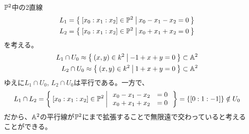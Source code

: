 \documentclass{ltjsreport}
\begin{document}
\begin{eg}
  $\mathbb{P}^2$中の2直線
  \begin{align*}
    L_1=\left\{\:[x_0:x_1:x_2]\in\mathbb{P}^2\:\middle|\:x_0-x_1-x_2=0\:\right\}\\
    L_2=\left\{\:[x_0:x_1:x_2]\in\mathbb{P}^2\:\middle|\:x_0+x_1+x_2=0\:\right\}
  \end{align*}
  を考える。
  \begin{align*}
    L_1\cap U_0\approx\left\{\:(x,y)\in k^2\:\middle|\:-1+x+y=0\:\right\}\subset\mathbb{A}^2\\
    L_2\cap U_0\approx\left\{\:(x,y)\in k^2\:\middle|\:1+x+y=0\:\right\}\subset\mathbb{A}^2
  \end{align*}
  ゆえに$L_1\cap U_0$, $L_2\cap U_0$は平行である。一方で、
  \[
  L_1\cap L_2=\left\{\:[x_0:x_1:x_2]\in\mathbb{P}^2\:\middle|\:
    \begin{array}{cc}
      x_0-x_1-x_2 & =0\\
      x_0+x_1+x_2 & =0
    \end{array}\:\right\}=\{[0:1:-1]\}\notin U_0
  \]
  だから、$\mathbb{A}^2$の平行線が$\mathbb{P}^2$にまで拡張することで無限遠で交わっていると考えることができる。
\end{eg}
\end{document}

